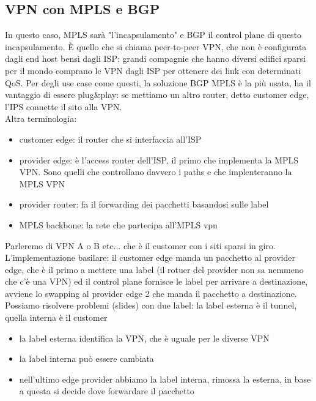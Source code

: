 \documentclass[12pt, oneside]{extbook} %
\begin{document}
\subsection{VPN con MPLS e BGP}
In questo caso, MPLS sarà "l'incapsulamento" e BGP il control plane di questo incapsulamento. È quello che si chiama peer-to-peer VPN, che non è configurata dagli end host bensì dagli ISP: grandi compagnie che hanno diversi edifici sparsi per il mondo comprano le VPN dagli ISP per ottenere dei link con determinati QoS. Per degli use case come questi, la soluzione BGP MPLS è la più usata, ha il vantaggio di essere plug\&play: se mettiamo un altro router, detto customer edge, l'IPS connette il sito alla VPN.\\ Altra terminologia:
\begin{itemize}
\item customer edge: il router che si interfaccia all'ISP
\item provider edge: è l'access router dell'ISP, il primo che implementa la MPLS VPN. Sono quelli che controllano davvero i paths e che implenteranno la MPLS VPN
\item provider router: fa il forwarding dei pacchetti basandosi sulle label
\item MPLS backbone: la rete che partecipa all'MPLS vpn
\end{itemize}
Parleremo di VPN A o B etc... che è il customer con i siti sparsi in giro.\\L'implementazione basilare: il customer edge manda un pacchetto al provider edge, che è il primo a mettere una label (il rotuer del provider non sa nemmeno che c'è una VPN) ed il control plane fornisce le label per arrivare a destinazione, avviene lo swapping al provider edge 2 che manda il pacchetto a destinazione.\\ Possiamo risolvere problemi (slides) con due label: la label esterna è il tunnel, quella interna è il customer
\begin{itemize}
\item la label esterna identifica la VPN, che è uguale per le diverse VPN
\item la label interna può essere cambiata
\item nell'ultimo edge provider abbiamo la label interna, rimossa la esterna, in base a questa si decide dove forwardare il pacchetto
\end{itemize}
\end{document}
